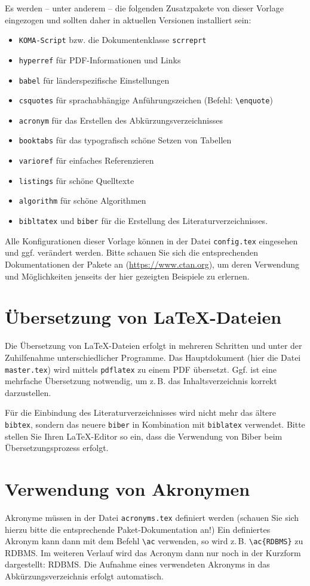 Es werden -- unter anderem -- die folgenden Zusatzpakete von dieser Vorlage eingezogen und sollten daher in aktuellen Versionen installiert sein: 
\begin{itemize}
	\item\texttt{KOMA-Script} bzw. die Dokumentenklasse \texttt{scrreprt}
	\item\texttt{hyperref} für PDF-Informationen und Links 
	\item \texttt{babel} für länderspezifische Einstellungen
	\item \texttt{csquotes} für sprachabhängige Anführungszeichen (Befehl: \texttt{\textbackslash enquote})
	\item \texttt{acronym} für das Erstellen des Abkürzungsverzeichnisses 
	\item \texttt{booktabs} für das typografisch schöne Setzen von Tabellen 
	\item \texttt{varioref} für einfaches Referenzieren 
	\item \texttt{listings} für schöne Quelltexte
	\item \texttt{algorithm} für schöne Algorithmen
	\item \texttt{bibltatex} und \texttt{biber} für die Erstellung des Literaturverzeichnisses.
\end{itemize}
Alle Konfigurationen dieser Vorlage können in der Datei \texttt{config.tex} eingesehen und ggf. verändert werden. Bitte schauen Sie sich die entsprechenden Dokumentationen 
der Pakete an (\url{https://www.ctan.org}), um deren Verwendung und Möglichkeiten jenseits der hier gezeigten Beispiele zu erlernen.


\section{Übersetzung von \LaTeX-Dateien}
Die Übersetzung von \LaTeX-Dateien erfolgt in mehreren Schritten und unter der Zuhilfenahme unterschiedlicher Programme. Das Hauptdokument (hier die Datei \texttt{master.tex}) wird mittels \texttt{pdflatex} zu einem PDF übersetzt. Ggf. ist eine mehrfache Übersetzung notwendig, um z.\,B. das Inhaltsverzeichnis korrekt darzustellen. 

Für die Einbindung des Literaturverzeichnisses wird nicht mehr das ältere \texttt{bibtex}, sondern das neuere \texttt{biber} in Kombination mit \texttt{biblatex} verwendet. Bitte stellen Sie Ihren \LaTeX-Editor so ein, dass die Verwendung von Biber beim Übersetzungsprozess erfolgt. 

\section{Verwendung von Akronymen}
Akronyme müssen in der Datei \texttt{acronyms.tex} definiert werden (schauen Sie sich hierzu bitte die entsprechende Paket-Dokumentation an!)
Ein definiertes Akronym kann dann mit dem Befehl \texttt{\textbackslash ac} verwenden, so wird z.\,B. \texttt{\textbackslash ac\{RDBMS\}} zu \ac{RDBMS}. Im weiteren Verlauf wird das 
Acronym dann nur noch in der Kurzform dargestellt: \ac{RDBMS}. Die Aufnahme eines verwendeten Akronyms in das Abkürzungsverzeichnis erfolgt automatisch. \autocite[Vgl.][S. 42]{ME12}

